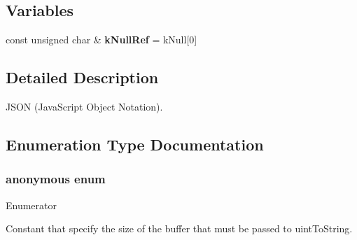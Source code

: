 \subsection*{Variables}
\begin{DoxyCompactItemize}
\item 
const unsigned char \& {\bfseries k\+Null\+Ref} = k\+Null\mbox{[}0\mbox{]}\hypertarget{namespaceJson_ab30055b4bbd82aecaca57ccecd63bbe6}{}\label{namespaceJson_ab30055b4bbd82aecaca57ccecd63bbe6}

\end{DoxyCompactItemize}


\subsection{Detailed Description}
J\+S\+ON (Java\+Script Object Notation). 

\subsection{Enumeration Type Documentation}
\subsubsection[{\texorpdfstring{anonymous enum}{anonymous enum}}]{\setlength{\rightskip}{0pt plus 5cm}anonymous enum}\hypertarget{namespaceJson_a2aacab54ef6fc18e833fbd4982a0a23a}{}\label{namespaceJson_a2aacab54ef6fc18e833fbd4982a0a23a}
\begin{Desc}
\item[Enumerator]\par
\begin{description}
\item[{\em 
uint\+To\+String\+Buffer\+Size\hypertarget{namespaceJson_a2aacab54ef6fc18e833fbd4982a0a23aae4f2008c7919f20d81286121d1374424}{}\label{namespaceJson_a2aacab54ef6fc18e833fbd4982a0a23aae4f2008c7919f20d81286121d1374424}
}]Constant that specify the size of the buffer that must be passed to uint\+To\+String. \end{description}
\end{Desc}
